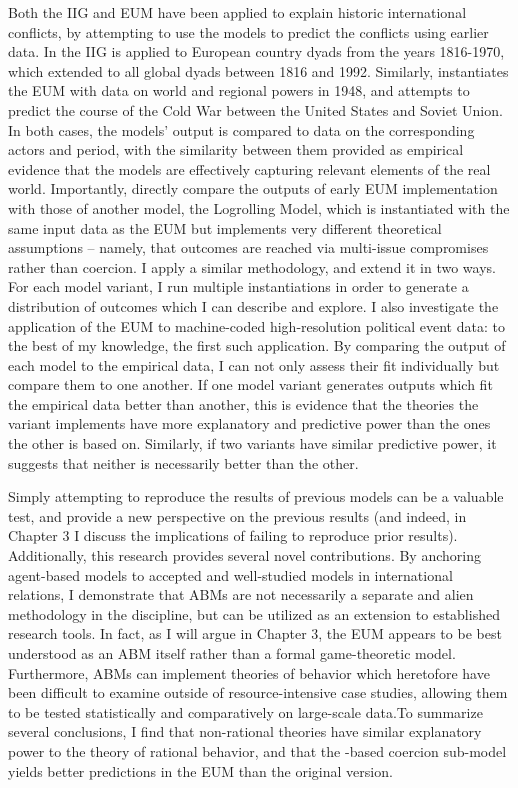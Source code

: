 Both the IIG and EUM have been applied to explain historic international conflicts, by attempting to use the models to predict the conflicts using earlier data. In \citet{bdm_1992} the IIG is applied to European country dyads from the years 1816-1970, which \citet{bennett_2000} extended to all global dyads between 1816 and 1992. Similarly, \citet{bdm_1998} instantiates the EUM with data on world and regional powers in 1948, and attempts to predict the course of the Cold War between the United States and Soviet Union. In both cases, the models' output is compared to data on the corresponding actors and period, with the similarity between them provided as empirical evidence that the models are effectively capturing relevant elements of the real world. Importantly, \citet{stokman_1994b} directly compare the outputs of early EUM implementation \citep{bdm_1994} with those of another model, the \citet{stokman_1994} Logrolling Model, which is instantiated with the same input data as the EUM but implements very different theoretical assumptions -- namely, that outcomes are reached via multi-issue compromises rather than coercion. I apply a similar methodology, and extend it in two ways. For each model variant, I run multiple instantiations in order to generate a distribution of outcomes which I can describe and explore. I also investigate the application of the EUM to machine-coded high-resolution political event data: to the best of my knowledge, the first such application. By comparing the output of each model to the empirical data, I can not only assess their fit individually but compare them to one another. If one model variant generates outputs which fit the empirical data better than another, this is evidence that the theories the variant implements have more explanatory and predictive power than the ones the other is based on. Similarly, if two variants have similar predictive power, it suggests that neither is necessarily better than the other.

Simply attempting to reproduce the results of previous models can be a valuable test, and provide a new perspective on the previous results (and indeed, in Chapter 3 I discuss the implications of failing to reproduce prior results). Additionally, this research provides several novel contributions. By anchoring agent-based models to accepted and well-studied models in international relations, I demonstrate that ABMs are not necessarily a separate and alien methodology in the discipline, but can be utilized as an extension to established research tools. In fact, as I will argue in Chapter 3, the EUM appears to be best understood as an ABM itself rather than a formal game-theoretic model. Furthermore, ABMs can implement theories of behavior which heretofore have been difficult to examine outside of resource-intensive case studies, allowing them to be tested statistically and comparatively on large-scale data.To summarize several conclusions, I find that non-rational theories have similar explanatory power to the theory of rational behavior, and that the \citet{schelling_1966}-based coercion sub-model yields better predictions in the EUM than the original version.

